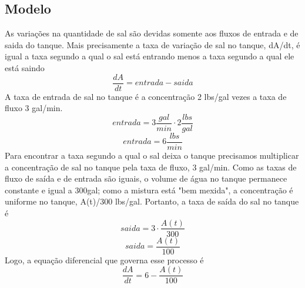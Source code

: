 \documentclass[12pt]{article}
\begin{document}
\subsection{Modelo}
As variações na quantidade de sal são devidas somente aos fluxos de entrada e de saida do tanque. Mais precisamente a taxa de variação de sal no tanque, dA/dt, é igual a taxa segundo a qual o sal está entrando menos a taxa segundo a qual ele está saindo
\begin{equation}
    \frac{dA}{dt} = entrada - saida
\end{equation}
A taxa de entrada de sal no tanque é a concentração 2 lbs/gal vezes a taxa de fluxo 3 gal/min.
\begin{equation}
    entrada = 3 \frac{gal}{min} \cdot 2 \frac{lbs}{gal}
\end{equation}
\begin{equation}
    entrada = 6 \frac{lbs}{min}
\end{equation}
Para encontrar a taxa segundo a qual o sal deixa o tanque precisamos multiplicar a concentração de sal no tanque pela taxa de fluxo, 3 gal/min. Como as taxas de fluxo de saída e de entrada são iguais, o volume de água no tanque permanece constante e igual a 300gal; como a mistura está "bem mexida", a concentração é uniforme no tanque, A(t)/300 lbs/gal. Portanto, a taxa de saída do sal no tanque é
\begin{equation}
    saida = 3 \cdot \frac{A(t)}{300}
\end{equation}
\begin{equation}
    saida = \frac{A(t)}{100}
\end{equation}
Logo, a equação diferencial que governa esse processo é
\begin{equation}
    \frac{dA}{dt} = 6 - \frac{A(t)}{100}
\label{eq_7}
\end{equation}
\end{document}
